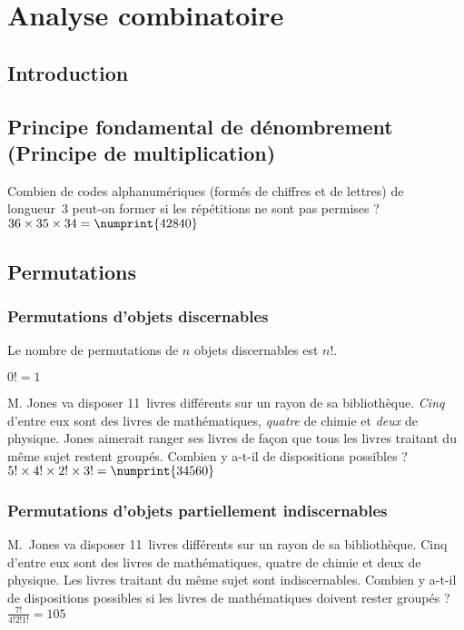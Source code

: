 \chapter{Analyse combinatoire}
\section{Introduction}

\section[Principe fondamental de dénombrement (Principe de multiplication)]{Principe fondamental de dénombrement\\(Principe de multiplication)}

 Combien de codes alphanumériques (formés de chiffres et de lettres) de longueur~3 peut-on former si les répétitions ne sont pas permises ?
\sol $36 \times 35 \times 34 = \numprint{42840}$



\section{Permutations}
\subsection{Permutations d’objets discernables}

Le nombre de permutations de $n$ objets discernables est $n!$.

$0! = 1$

 M. Jones va disposer 11~livres différents sur un rayon de sa bibliothèque. \emph{Cinq} d’entre eux sont des livres de mathématiques, \emph{quatre} de chimie et \emph{deux} de physique. Jones aimerait ranger ses livres de façon que tous les livres traitant du même sujet restent groupés. Combien y a-t-il de dispositions possibles ?
 $5! \times 4! \times 2! \times 3! = \numprint{34560}$


\subsection{Permutations d’objets partiellement indiscernables}
 M.~Jones va disposer 11~livres différents sur un rayon de sa bibliothèque. Cinq d’entre eux sont des livres de mathématiques, quatre de chimie et deux de physique. Les livres traitant du même sujet sont indiscernables. Combien y a-t-il de dispositions possibles si les livres de mathématiques doivent rester groupés ?
\sol $\frac{7!}{4!2!1!} = 105$

